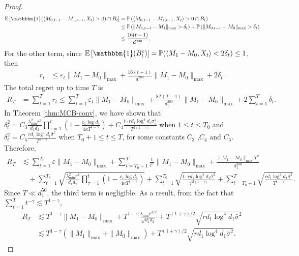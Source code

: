 \documentclass[12pt]{article}
\newcommand{\inp}[2]{\langle #1,#2\rangle}
\newcommand{\PP}{\mathbb{P}}
\def\EE{{\mathbb E}}
\def\PP{{\mathbb P}}
\theoremstyle{plain}
\begin{document}
\begin{proof}
\begin{align*}
    \EE\left[\mathbbm{1}(\inp{{M}_{0,t-1}-{M}_{1,t-1}}{X_t}> 0)\cap B_t\right]&= \PP\left(\inp{{M}_{0,t-1}-{M}_{1,t-1}}{X_t}> 0 \cap B_t\right) \\
    &\leq \PP\left(\|{M}_{1,t-1}-M_1\|_{\max}>\delta_t\right) + \PP\left(\|{M}_{0,t-1}-M_0\|_{\max}>\delta_t\right) \\
    &\leq \frac{16(t-1)}{d^{200}},
\end{align*}
For the other term, since $\EE\left[\mathbbm{1}(B_t^c)\right]=\PP(\inp{M_1-M_0}{X_t}<2\delta_t)\leq 1$, then
\begin{align*}
    r_t&\leq \varepsilon_t\|M_1-M_0\|_{\max} + \frac{16(t-1)}{d^{200}}\|M_1-M_0\|_{\max}  + 2\delta_t. 
\end{align*}
The total regret up to time $T$ is
\begin{align*}
    R_T&=\sum_{t=1}^{T} r_t \leq \sum_{t=1}^T\varepsilon_t \|M_1-M_0\|_{\max} + \frac{8T(T-1)}{d_1^{200}}\|M_1-M_0\|_{\max}  + 2\sum_{t=1}^{T} \delta_t.
\end{align*}
In Theorem \ref{thm:MCB-conv}, we have shown that $\delta_t^2= C_3\frac{\lambda_{\min}^2r^3}{d_1d_2}  \prod_{\tau=1}^{t}(1-\frac{c_1\log d_1}{4\kappa T^{1-\gamma}}) + C_4\frac{t\cdot rd_1\log^4d_1\sigma_i^2}{T^{2(1-\gamma)}}$ when $1\leq t\leq T_0$ and $\delta_t^2=C_5\frac{rd_1\log^4d_1\bar{\sigma}^2}{T^{1-\gamma}}$ when $T_0+1\leq t\leq T$, for some constants $C_3$ ,$C_4$ and $C_5$. Therefore,
\begin{align*}
    R_T&\lesssim \sum_{t=1}^{T_0}\varepsilon \|M_1-M_0\|_{\max} + \sum_{t=T_0 + 1}^{T}\frac{1}{t^\gamma}\|M_1-M_0\|_{\max}   + \frac{\|M_1-M_0\|_{\max}T^2}{d_1^{200}} \\ &\quad + \sum_{t=1}^{T_0} \sqrt{\frac{\lambda_{\min}^2r^3}{d_1d_2}  \prod_{\tau=1}^{t}(1-\frac{c_1\log d_1}{4\kappa T^{1-\gamma}})} + \sum_{t=1}^{T_0} \sqrt{\frac{t\cdot rd_1\log^4d_1\bar{\sigma}^2}{T^{2(1-\gamma)}}} + \sum_{t=T_0+1}^{T} \sqrt{\frac{rd_1\log^4d_1\bar{\sigma}^2}{T^{1-\gamma}}}.
\end{align*}
Since $T\ll d_1^{50}$, the third term is negligible. As a result, from the fact that $\sum_{t=1}^T t^{-\gamma}\lesssim T^{1-\gamma}$,
\begin{align*}
    R_T&\lesssim T^{1-\gamma}\|M_1-M_0\|_{\max} + T^{1-\gamma}\frac{\lambda_{\min}r^{3/2}}{\sqrt{d_1d_2}}  + T^{(1+\gamma)/2}\sqrt{rd_1\log^4d_1\bar{\sigma}^2} \\
    &\lesssim T^{1-\gamma}(\|M_1\|_{\max} + \|M_0\|_{\max}) + T^{(1+\gamma)/2}\sqrt{rd_1\log^4d_1\bar{\sigma}^2}.
\end{align*}
\end{proof}
\end{document}
